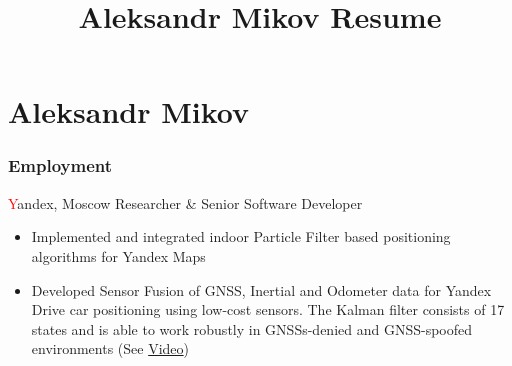 \documentclass{tccv}
\title{Aleksandr Mikov Resume}
\makeatletter
\newcommand{\about@me}{}
\newcommand{\aboutme}[1]{\renewcommand{\about@me}{\subsection{About Me}#1}}
\makeatother
\begin{document}
\aboutme{\center{Researcher and algorithm developer in the indoor and outdoor navigation field\\with an emphasis on automotive and pedestrian applications.}}
\part{Aleksandr Mikov}

\section{Employment}

\begin{eventlist}

     {\textcolor{red}{Y}andex, Moscow}
     {Researcher \& Senior Software Developer}
\begin{itemize}
    \item Implemented and integrated indoor Particle Filter based positioning algorithms for Yandex Maps
    \item Developed Sensor Fusion of GNSS, Inertial and Odometer data for Yandex Drive car positioning using low-cost sensors. The Kalman filter consists of 17 states and is able to work robustly in GNSSs-denied and GNSS-spoofed environments (See \href{https://www.dropbox.com/s/jkawevakrhy58hc/LefortovskiyFast.mp4}{Video})
\end{itemize}


\end{eventlist}
\end{document}
